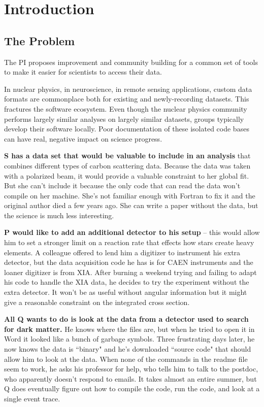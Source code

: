 
\section{Introduction}\label{sec:overview}

\subsection{The Problem}
The PI proposes improvement and community building for a common set of tools to make it easier for scientists to access their data.

In nuclear physics, in neuroscience, in remote sensing applications, custom data formats are commonplace both for existing and newly-recording datasets.  This fractures the software ecosystem.  Even though the nuclear physics community performs largely similar analyses on largely similar datasets, groups typically develop their software locally.  Poor documentation of these isolated code bases can have real, negative impact on science progress. 
 
\textbf{S has a data set that would be valuable to include in an analysis} that combines different types of carbon scattering data.  Because the data was taken with a polarized beam, it would provide a valuable constraint to her global fit.  But she can't include it because the only code that can read the data won't compile on her machine.  She's not familiar enough with Fortran to fix it and the original author died a few years ago.  She can write a paper without the data, but the science is much less interesting. 
 
\textbf{P would like to add an additional detector to his setup} -- this would allow him to set a stronger limit on a reaction rate that effects how stars create heavy elements.  A colleague offered to lend him a digitizer to instrument his extra detector, but the data acquisition code he has is for CAEN instruments and the loaner digitizer is from XIA.  After burning a weekend trying and failing to adapt his code to handle the XIA data, he decides to try the experiment without the extra detector.  It won't be as useful without angular information but it might give a reasonable constraint on the integrated cross section.
 
\textbf{All Q wants to do is look at the data from a detector used to search for dark matter.}  He knows where the files are, but when he tried to open it in Word it looked like a bunch of garbage symbols.  Three frustrating days later, he now knows the data is ``binary" and he's downloaded ``source code"  
that should allow him to look at the data.  When none of the commands in the readme file seem to work, he asks his professor for help, who tells him to talk to the postdoc, who apparently doesn't respond to emails.  It takes almost an entire summer, but Q does eventually figure out how to compile the code, run the code, and look at a single event trace.   

